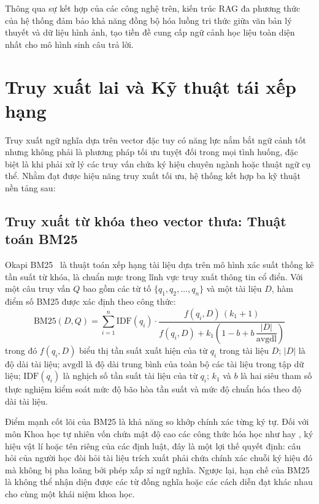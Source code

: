 Thông qua sự kết hợp của các công nghệ trên, kiến trúc RAG đa phương thức của hệ thống đảm bảo khả năng đồng bộ hóa luồng tri thức giữa văn bản lý thuyết và dữ liệu hình ảnh, tạo tiền đề cung cấp ngữ cảnh học liệu toàn diện nhất cho mô hình sinh câu trả lời.

\section{Truy xuất lai và Kỹ thuật tái xếp hạng}
\label{sec:cosolythuyet_hybrid}
Truy xuất ngữ nghĩa dựa trên vector đặc tuy có năng lực nắm bắt ngữ cảnh tốt nhưng không phải là phương pháp tối ưu tuyệt đối trong mọi tình huống, đặc biệt là khi phải xử lý các truy vấn chứa ký hiệu chuyên ngành hoặc thuật ngữ cụ thể. Nhằm đạt được hiệu năng truy xuất tối ưu, hệ thống kết hợp ba kỹ thuật nền tảng sau:

\subsection{Truy xuất từ khóa theo vector thưa: Thuật toán BM25}
Okapi BM25~\cite{robertson2009bm25} là thuật toán xếp hạng tài liệu dựa trên mô hình xác suất thống kê tần suất từ khóa, là chuẩn mực trong lĩnh vực truy xuất thông tin cổ điển. Với một câu truy vấn $Q$ bao gồm các từ tố $\{q_1, q_2, \dots, q_n\}$ và một tài liệu $D$, hàm điểm số BM25 được xác định theo công thức:
\begin{equation}
\mathrm{BM25}(D, Q) = \sum_{i=1}^{n} \mathrm{IDF}(q_i) \cdot
\frac{f(q_i, D)\,(k_1 + 1)}{f(q_i, D) + k_1\left(1 - b + b\,\dfrac{|D|}{\mathrm{avgdl}}\right)}
\end{equation}
trong đó $f(q_i, D)$ biểu thị tần suất xuất hiện của từ $q_i$ trong tài liệu $D$; $|D|$ là độ dài tài liệu; $\mathrm{avgdl}$ là độ dài trung bình của toàn bộ các tài liệu trong tập dữ liệu; $\mathrm{IDF}(q_i)$ là nghịch số tần suất tài liệu của từ $q_i$; $k_1$ và $b$ là hai siêu tham số thực nghiệm kiểm soát mức độ bão hòa tần suất và mức độ chuẩn hóa theo độ dài tài liệu.

Điểm mạnh cốt lõi của BM25 là khả năng so khớp chính xác từng ký tự. Đối với môn Khoa học tự nhiên vốn chứa mật độ cao các công thức hóa học như  hay , ký hiệu vật lí hoặc tên riêng của các định luật, đây là một lợi thế quyết định: câu hỏi của người học đòi hỏi tài liệu trích xuất phải chứa chính xác chuỗi ký hiệu đó mà không bị pha loãng bởi phép xấp xỉ ngữ nghĩa. Ngược lại, hạn chế của BM25 là không thể nhận diện được các từ đồng nghĩa hoặc các cách diễn đạt khác nhau cho cùng một khái niệm khoa học.

